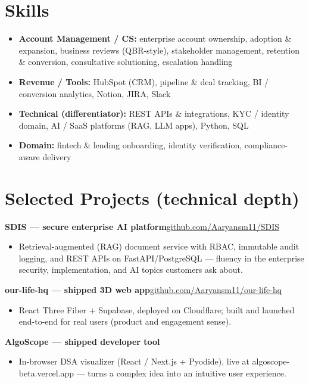 \documentclass[10pt,a4paper]{article}
\begin{document}
\section*{Skills}
\begin{itemize}
\item \textbf{Account Management / CS:} enterprise account ownership, adoption \& expansion, business reviews (QBR-style), stakeholder management, retention \& conversion, consultative solutioning, escalation handling
\item \textbf{Revenue / Tools:} HubSpot (CRM), pipeline \& deal tracking, BI / conversion analytics, Notion, JIRA, Slack
\item \textbf{Technical (differentiator):} REST APIs \& integrations, KYC / identity domain, AI / SaaS platforms (RAG, LLM apps), Python, SQL
\item \textbf{Domain:} fintech \& lending onboarding, identity verification, compliance-aware delivery
\end{itemize}
\section*{Selected Projects (technical depth)}
\vspace{1pt}\textbf{SDIS --- secure enterprise AI platform}\hfill {\small\href{https://github.com/Aaryansm11/SDIS}{github.com/Aaryansm11/SDIS}}
\begin{itemize}
\item Retrieval-augmented (RAG) document service with RBAC, immutable audit logging, and REST APIs on FastAPI/PostgreSQL --- fluency in the enterprise security, implementation, and AI topics customers ask about.
\end{itemize}
\vspace{1pt}\textbf{our-life-hq --- shipped 3D web app}\hfill {\small\href{https://github.com/Aaryansm11/our-life-hq}{github.com/Aaryansm11/our-life-hq}}
\begin{itemize}
\item React Three Fiber + Supabase, deployed on Cloudflare; built and launched end-to-end for real users (product and engagement sense).
\end{itemize}
\vspace{1pt}\textbf{AlgoScope --- shipped developer tool}
\begin{itemize}
\item In-browser DSA visualizer (React / Next.js + Pyodide), live at algoscope-beta.vercel.app --- turns a complex idea into an intuitive user experience.
\end{itemize}
\end{document}

